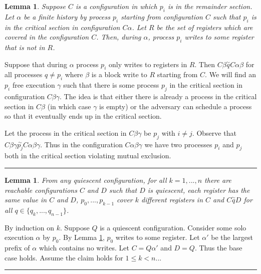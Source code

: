 \documentclass[twoside]{article}
\newtheorem{lemma}[theorem]{Lemma}
\newenvironment{proof}{{\bf Proof:}}{\hfill\rule{2mm}{2mm}}
\begin{document}
\begin{lemma}
\label{lem:lbwritetodiff}
Suppose $C$ is a configuration in which $p_i$ is in the remainder section. Let $\alpha$ be a finite history by process $p_i$ starting from configuration $C$ such that $p_i$ is in the critical section in configuration $C\alpha$. Let $R$ be the set of registers which are covered in the configuration $C$. Then, during $\alpha$, process $p_i$ writes to some register that is not in $R$. 
\end{lemma}
\begin{proof}
Suppose that during $\alpha$ process $p_i$ only writes to registers in $R$. Then $C\beta \stackrel{\sim}{q} C\alpha\beta$ for all processes $q \neq p_i$ where $\beta$ is a block write to $R$ starting from $C$. We will find an $p_i$ free execution $\gamma$ such that there is some process $p_j$ in the critical section in configuration $C\beta\gamma$. The idea is that either there is already a process in the critical section in $C\beta$ (in which case $\gamma$ is empty) or the adversary can schedule a process so that it eventually ends up in the critical section. 

Let the process in the critical section in $C\beta\gamma$ be $p_j$ with $i \neq j$. Observe that $C\beta\gamma \stackrel{\sim}{p_j} C\alpha\beta\gamma$. Thus in the configuration $C\alpha\beta\gamma$ we have two processes $p_i$ and $p_j$ both in the critical section violating mutual exclusion.
\end{proof}

\begin{lemma}
\label{lem:lbquiescent}
From any quiescent configuration, for all $k = 1, ..., n$ there are reachable configurations $C$ and $D$ such that $D$ is quiescent, each register has the same value in $C$ and $D$, $p_0, ..., p_{k-1}$ cover $k$ different registers in $C$ and $C \stackrel{\sim}{q} D$ for all $q \in \{q_{k}, ..., q_{n-1}\}$. 
\end{lemma}
\begin{proof}
By induction on $k$. Suppose $Q$ is a quiescent configuration. Consider some solo execution $\alpha$ by $p_0$. By Lemma \ref{lem:lbwritetodiff}, $p_0$ writes to some register. Let $\alpha'$ be the largest prefix of $\alpha$ which contains no writes. Let $C = Q\alpha'$ and $D = Q$. Thus the base case holds. Assume the claim holds for $1\leq k < n$...
\end{proof}
\end{document}
